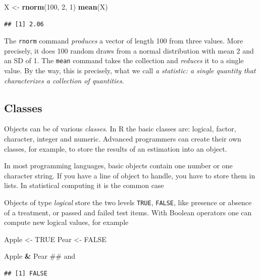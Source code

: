 \documentclass[]{svmono}
\newenvironment{Shaded}{\begin{snugshade}}{\end{snugshade}}
\newcommand{\KeywordTok}[1]{\textcolor[rgb]{0.13,0.29,0.53}{\textbf{#1}}}
\newcommand{\DecValTok}[1]{\textcolor[rgb]{0.00,0.00,0.81}{#1}}
\newcommand{\StringTok}[1]{\textcolor[rgb]{0.31,0.60,0.02}{#1}}
\newcommand{\OtherTok}[1]{\textcolor[rgb]{0.56,0.35,0.01}{#1}}
\newcommand{\OperatorTok}[1]{\textcolor[rgb]{0.81,0.36,0.00}{\textbf{#1}}}
\newcommand{\NormalTok}[1]{#1}
\begin{document}
\begin{Shaded}
\begin{Highlighting}[]
\NormalTok{X <-}\StringTok{ }\KeywordTok{rnorm}\NormalTok{(}\DecValTok{100}\NormalTok{, }\DecValTok{2}\NormalTok{, }\DecValTok{1}\NormalTok{)}
\KeywordTok{mean}\NormalTok{(X)}
\end{Highlighting}
\end{Shaded}

\begin{verbatim}
## [1] 2.06
\end{verbatim}

The \texttt{rnorm} command \emph{produces} a vector of length 100 from
three values. More precisely, it does 100 random draws from a normal
distribution with mean 2 and an SD of 1. The \texttt{mean} command takes
the collection and \emph{reduces} it to a single value. By the way, this
is precisely, what we call \emph{a statistic: a single quantity that
characterizes a collection of quantities}.

\subsection{Classes}\label{classes}

Objects can be of various \emph{classes}. In R the basic classes are:
logical, factor, character, integer and numeric. Advanced programmers
can create their own classes, for example, to store the results of an
estimation into an object.

In most programming languages, basic objects contain one number or one
character string. If you have a line of object to handle, you have to
store them in lists. In statistical computing it is the common case

Objects of type \emph{logical} store the two levels \texttt{TRUE},
\texttt{FALSE}, like presence or absence of a treatment, or passed and
failed test items. With Boolean operators one can compute new logical
values, for example

\begin{Shaded}
\begin{Highlighting}[]
\NormalTok{Apple <-}\StringTok{ }\OtherTok{TRUE}
\NormalTok{Pear  <-}\StringTok{ }\OtherTok{FALSE}

\NormalTok{Apple }\OperatorTok{&}\StringTok{ }\NormalTok{Pear ## and}
\end{Highlighting}
\end{Shaded}

\begin{verbatim}
## [1] FALSE
\end{verbatim}
\end{document}
